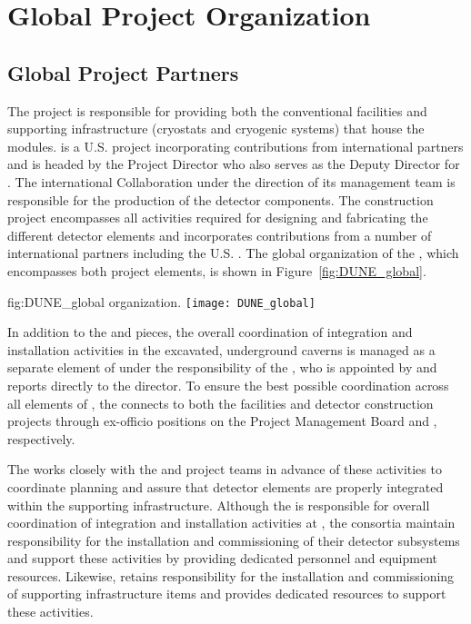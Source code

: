 \chapter{Global Project Organization}
\label{vl:tc-global}

\section{Global Project Partners}
\label{sec:partners}

The  project is responsible for providing both the 
conventional facilities and supporting infrastructure (cryostats 
and cryogenic systems) that house the   
modules.  is a U.S.  project incorporating 
contributions from international partners and is headed by the 
 Project Director who also serves as the  
Deputy Director for .  The international  
Collaboration under the direction of its management team is 
responsible for the production of the detector components.  The 
  construction project encompasses all 
activities required for designing and fabricating the different 
detector elements and incorporates contributions from a number 
of international partners including the U.S. .  The 
global organization of the , which encompasses 
both project elements, is shown in Figure~\ref{fig:DUNE_global}.
\begin{dunefigure}{fig:DUNE_global}
  { organization.}
  \texttt{[image: DUNE\_global]}
\end{dunefigure}

In addition to the  and  pieces, the 
overall coordination of integration and installation activities 
in the excavated, underground caverns is managed as a separate
element of  under the responsibility of 
the , who is appointed by and reports directly to the 
 director.  To ensure the best possible coordination 
across all elements of , the  connects 
to both the facilities and detector construction projects through 
ex-officio positions on the  Project Management Board 
and  , respectively.

The  works closely with the  and 
project teams in advance of these activities to coordinate planning
and assure that detector elements are properly integrated within the 
supporting infrastructure.  Although the  is responsible 
for overall coordination of integration and installation activities
at , the  consortia maintain responsibility 
for the installation and commissioning of their detector subsystems
and support these activities by providing dedicated personnel and
equipment resources.  Likewise,  retains responsibility
for the installation and commissioning of supporting infrastructure
items and provides dedicated resources to support these activities.          

